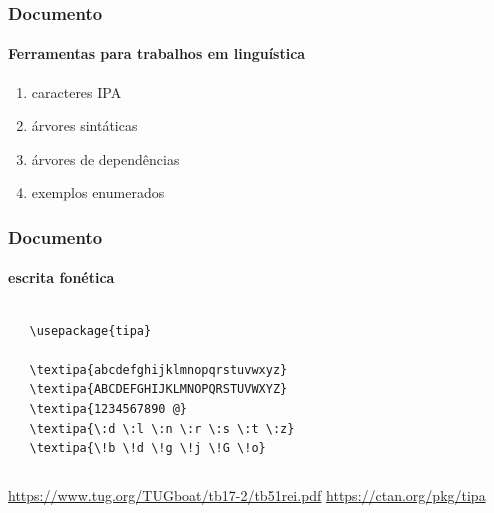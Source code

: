 \begin{frame}[fragile]
\frametitle{Documento}
\framesubtitle{Ferramentas para trabalhos em linguística}

\begin{enumerate}
    \item caracteres IPA
    \item árvores sintáticas
    \item árvores de dependências
    \item exemplos enumerados
\end{enumerate}

\end{frame}

\begin{frame}[fragile]
\frametitle{Documento}
\framesubtitle{escrita fonética}
  \scriptsize
  \begin{columns}[c]
  \begin{verbatim}
   \usepackage{tipa}
   
   \textipa{abcdefghijklmnopqrstuvwxyz}
   \textipa{ABCDEFGHIJKLMNOPQRSTUVWXYZ}
   \textipa{1234567890 @}
   \textipa{\:d \:l \:n \:r \:s \:t \:z}
   \textipa{\!b \!d \!g \!j \!G \!o}
  \end{verbatim}
  \begin{fmpage}{\textwidth}
  \end{fmpage}
  \end{columns}
  
  \url{https://www.tug.org/TUGboat/tb17-2/tb51rei.pdf}
  \url{https://ctan.org/pkg/tipa}
\end{frame}


